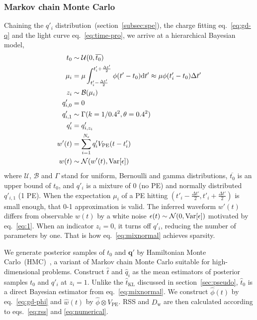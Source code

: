 \subsubsection{Markov chain Monte Carlo}
\label{subsec:mcmc}
Chaining the $q'_i$ distribution~(section~\ref{subsec:spe}), the charge fitting eq.~\eqref{eq:gd-q} and the light curve eq.~\eqref{eq:time-pro}, we arrive at a hierarchical Bayesian model,
\begin{equation}
  \begin{aligned}
    t_{0} &\sim \mathcal{U}(0, \overline{t_0}) \\
    \mu_i &= \mu \int_{t'_i-\frac{\Delta t'}{2}}^{t'_i+\frac{\Delta t'}{2}} \phi(t' - t_0)\mathrm{d}t' \approx \mu\phi(t'_i - t_0)\Delta{t'} \\
    z_i &\sim \mathcal{B}(\mu_i) \\
    q'_{i,0}&=0\\
    q'_{i,1}& \sim \Gamma(k=1/0.4^2, \theta=0.4^2)\\
    q'_i &= q'_{i,z_i}\\
    w'(t) & = \sum_{i=1}^{N_\mathrm{s}}q'_iV_\mathrm{PE}(t-t'_i)\\
    w(t) &\sim \mathcal{N}(w'(t), \operatorname{Var}[\epsilon])
  \end{aligned}
  \label{eq:mixnormal}
\end{equation}
where $\mathcal{U}$, $\mathcal{B}$ and $\Gamma$ stand for uniform, Bernoulli and gamma distributions, $\overline{t_0}$ is an upper bound of $t_0$, and $q'_i$ is a mixture of 0 (no PE) and normally distributed $q'_{i,1}$ (1 PE). When the expectation $\mu_i$ of a PE hitting $(t'_{i} - \frac{\Delta t'}{2}, t'_{i} + \frac{\Delta t'}{2})$ is small enough, that 0-1 approximation is valid.  The inferred waveform $w'(t)$ differs from observable $w(t)$ by a white noise $\epsilon(t) \sim \mathcal{N}(0, \operatorname{Var}[\epsilon])$ motivated by eq.~\eqref{eq:1}.  When an indicator $z_i=0$, it turns off $q'_i$, reducing the number of parameters by one.  That is how eq.~\eqref{eq:mixnormal} achieves sparsity.

We generate posterior samples of $t_0$ and $\bm{q'}$ by Hamiltonian Monte Carlo~(HMC)~\cite{neal_mcmc_2012}, a variant of Markov chain Monte Carlo suitable for high-dimensional problems. Construct $\hat{t}$ and $\hat{q}_i$ as the mean estimators of posterior samples $t_0$ and $q'_i$ at $z_i=1$.  Unlike the $\hat{t}_\mathrm{KL}$ discussed in section~\ref{sec:pseudo}, $\hat{t}_0$ is a direct Bayesian estimator from eq.~\eqref{eq:mixnormal}.  We construct $\hat{\phi}(t)$ by eq.~\eqref{eq:gd-phi} and $\hat{w}(t)$ by $\hat{\phi} \otimes V_\mathrm{PE}$. RSS and $D_\mathrm{w}$ are then calculated according to eqs.~\eqref{eq:rss} and \eqref{eq:numerical}.

